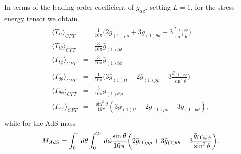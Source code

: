 \documentclass[12pt]{iopart} %
\begin{document}
In terms of the leading order coefficient of $\bar{g}_{\alpha\beta}$, setting $L=1$, for the stress-energy tensor we obtain
\begin{eqnarray}
\langle T_{tt}\rangle_{CFT}&=&\frac{1}{16\pi} \biggl(2\bar{g}_{(1)\rho\rho}+3\bar{g}_{(1)\theta\theta}+3\frac{\bar{g}_{(1)\phi\phi}}{\sin^2\theta}\biggr) \nonumber \\
\langle T_{t\theta}\rangle_{CFT}&=&\frac{3}{16\pi}\bar{g}_{(1)t\theta} \nonumber \\
\langle T_{t\phi}\rangle_{CFT}&=&\frac{3}{16\pi}\bar{g}_{(1)t\phi} \nonumber \\
\langle T_{\theta\theta}\rangle_{CFT}&=&\frac{1}{16\pi} \biggl(3\bar{g}_{(1)tt}-2\bar{g}_{(1)\rho\rho}-3\frac{\bar{g}_{(1)\phi\phi}}{\sin^2\theta}\biggr) \nonumber \\
\langle T_{\theta\phi}\rangle_{CFT}&=&\frac{3}{16\pi}\bar{g}_{(1)\theta\phi} \nonumber \\
\langle T_{\phi\phi}\rangle_{CFT}&=&\frac{\sin^2\theta}{16\pi} (3\bar{g}_{(1)tt}-2\bar{g}_{(1)\rho\rho}-3\bar{g}_{(1)\theta\theta}), \nonumber \\
\end{eqnarray}
while for the AdS mass
\begin{equation}
M_{AdS}=\int_0^\pi d\theta \int_0^{2\pi}d\phi\frac{\sin\theta}{16\pi} \biggl(2\bar{g}_{(1)\rho\rho}+3\bar{g}_{(1)\theta\theta}+3\frac{\bar{g}_{(1)\phi\phi}}{\sin^2\theta}\biggr) \nonumber. \\
\end{equation}
\end{document}
